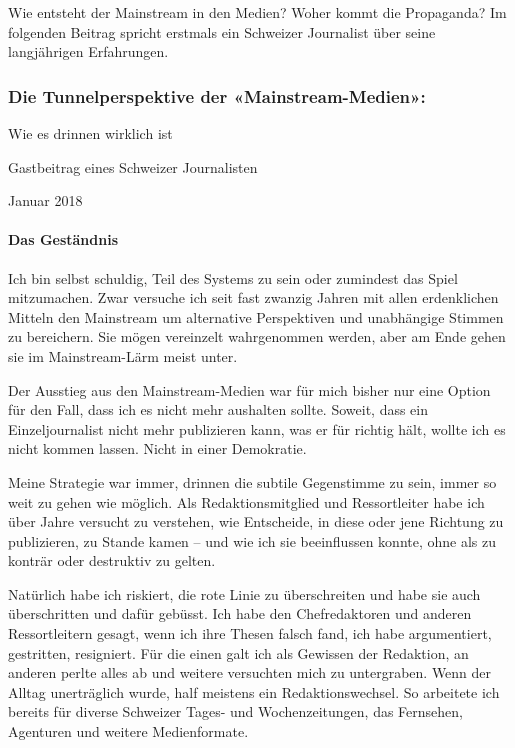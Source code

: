 Wie entsteht der Mainstream in den Medien? Woher kommt die Propaganda?
Im folgenden Beitrag spricht erstmals ein Schweizer Journalist über
seine langjährigen Erfahrungen.

\hypertarget{die-tunnelperspektive-der-mainstream-medien}{%
\subsubsection{Die Tunnelperspektive der
«Mainstream-Medien»:}\label{die-tunnelperspektive-der-mainstream-medien}}

Wie es drinnen wirklich ist

Gastbeitrag eines Schweizer Journalisten

Januar 2018

\hypertarget{das-gestuxe4ndnis}{%
\paragraph{Das Geständnis}\label{das-gestuxe4ndnis}}

Ich bin selbst schuldig, Teil des Systems zu sein oder zumindest das
Spiel mitzumachen. Zwar versuche ich seit fast zwanzig Jahren mit allen
erdenklichen Mitteln den Mainstream um alternative Perspektiven und
unabhängige Stimmen zu bereichern. Sie mögen vereinzelt wahrgenommen
werden, aber am Ende gehen sie im Mainstream-Lärm meist unter.

Der Ausstieg aus den Mainstream-Medien war für mich bisher nur eine
Option für den Fall, dass ich es nicht mehr aushalten sollte. Soweit,
dass ein Einzeljournalist nicht mehr publizieren kann, was er für
richtig hält, wollte ich es nicht kommen lassen. Nicht in einer
Demokratie.

Meine Strategie war immer, drinnen die subtile Gegenstimme zu sein,
immer so weit zu gehen wie möglich. Als Redaktionsmitglied und
Ressortleiter habe ich über Jahre versucht zu verstehen, wie Entscheide,
in diese oder jene Richtung zu publizieren, zu Stande kamen -- und wie
ich sie beeinflussen konnte, ohne als zu konträr oder destruktiv zu
gelten.

Natürlich habe ich riskiert, die rote Linie zu überschreiten und habe
sie auch überschritten und dafür gebüsst. Ich habe den Chefredaktoren
und anderen Ressortleitern gesagt, wenn ich ihre Thesen falsch fand, ich
habe argumentiert, gestritten, resigniert. Für die einen galt ich als
Gewissen der Redaktion, an anderen perlte alles ab und weitere
versuchten mich zu untergraben. Wenn der Alltag unerträglich wurde, half
meistens ein Redaktionswechsel. So arbeitete ich bereits für diverse
Schweizer Tages- und Wochenzeitungen, das Fernsehen, Agenturen und
weitere Medienformate.


